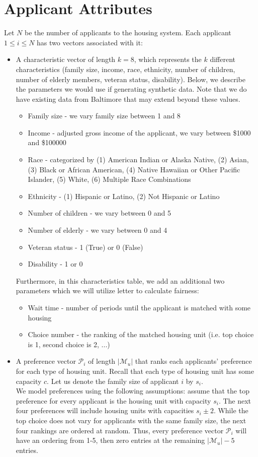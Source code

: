 \documentclass[11pt]{article}
\begin{document}
\section{Applicant Attributes}
Let $N$ be the number of applicants to the housing system. Each applicant $1 \leq i \leq N$ has two vectors associated with it: 
\begin{itemize}
    \item A characteristic vector of length $k = 8$, which represents the $k$ different characteristics (family size, income, race, ethnicity, number of children, number of elderly members, veteran status, disability). Below, we describe the parameters we would use if generating synthetic data. Note that we do have existing data from Baltimore that may extend beyond these values.
    \begin{itemize}
        \item Family size - we vary family size between 1 and 8
        \item Income - adjusted gross income of the applicant, we vary between \$1000 and \$100000
        \item Race - categorized by (1) American Indian or Alaska Native, (2) Asian, (3) Black or African American, (4) Native Hawaiian or Other Pacific Islander, (5) White, (6) Multiple Race Combinations
        \item Ethnicity - (1) Hispanic or Latino, (2) Not Hispanic or Latino
        \item Number of children - we vary between 0 and 5
        \item Number of elderly - we vary between 0 and 4
        \item Veteran status - 1 (True) or 0 (False)
        \item Disability - 1 or 0
    \end{itemize}
    Furthermore, in this characteristics table, we add an additional two parameters which we will utilize letter to calculate fairness:
    \begin{itemize}
        \item Wait time - number of periods until the applicant is matched with some housing
        \item Choice number - the ranking of the matched housing unit (i.e. top choice is 1, second choice is 2, ...)
    \end{itemize}
    \item A preference vector $\mathcal{P}_i$ of length $|\mathcal{M}_u|$ that ranks each applicants' preference for each type of housing unit. Recall that each type of housing unit has some capacity $c$. Let us denote the family size of applicant $i$ by $s_i$. \\
    \newline
    We model preferences using the following assumptions: assume that the top preference for every applicant is the housing unit with capacity $s_i$. The next four preferences will include housing units with capacities $s_i \pm 2$. While the top choice does not vary for applicants with the same family size, the next four rankings are ordered at random. Thus, every preference vector $\mathcal{P}_i$ will have an ordering from 1-5, then zero entries at the remaining $|\mathcal{M}_u| - 5$ entries.
\end{itemize} 
\end{document}
